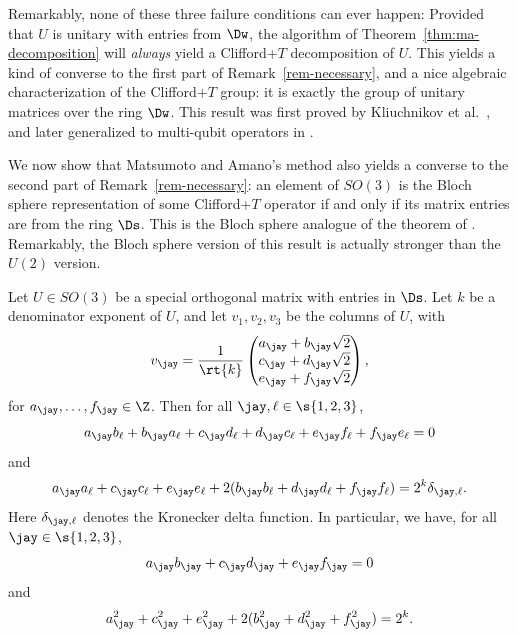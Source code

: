 \documentclass{article}
\begin{document}
Remarkably, none of these three failure conditions can ever happen:
Provided that $U$ is unitary with entries from $\Dw$, the algorithm of
Theorem~\ref{thm:ma-decomposition} will {\em always} yield a
Clifford+$T$ decomposition of $U$. This yields a kind of converse to
the first part of Remark~\ref{rem-necessary}, and a nice algebraic
characterization of the Clifford+$T$ group: it is exactly the group of
unitary matrices over the ring $\Dw$. This result was first proved by
Kliuchnikov et al.~{\cite{Kliuchnikov-etal}}, and later generalized to
multi-qubit operators in {\cite{Giles-Selinger}}.

We now show that Matsumoto and Amano's method also yields a converse
to the second part of Remark~\ref{rem-necessary}: an element of
$SO(3)$ is the Bloch sphere representation of some Clifford+$T$
operator if and only if its matrix entries are from the ring $\Ds$.
This is the Bloch sphere analogue of the theorem of
{\cite{Kliuchnikov-etal}}. Remarkably, the Bloch sphere version of
this result is actually stronger than the $U(2)$ version.

\begin{lemma}\label{lem:dot_product_is_simpler_in_ds}
  Let $U\in SO(3)$ be a special orthogonal matrix with entries in $\Ds$.
  Let $k$ be a denominator exponent of $U$, and let $v_1,v_2,v_3$ be
  the columns of $U$, with
  \[v_{\jay} = \frac{1}{\rt{k}}\left(\begin{matrix}
      a_{\jay}+b_{\jay}\sqrt{2} \\
      c_{\jay}+d_{\jay}\sqrt{2} \\
      e_{\jay}+f_{\jay}\sqrt{2}
    \end{matrix}\right),\]
  for $a_{\jay},\ldots,f_{\jay}\in\Z$.
  Then for all $\jay,\ell\in\s{1,2,3}$,
  \begin{equation}\label{eqn-abba}
    a_{\jay} b_{\ell}+b_{\jay} a_{\ell}+
            c_{\jay} d_{\ell}+d_{\jay} c_{\ell}+e_{\jay} f_{\ell}+f_{\jay} e_{\ell} = 0
  \end{equation}
  and
  \begin{equation}\label{eqn-aacc}
    a_{\jay} a_{\ell}+c_{\jay} c_{\ell}+e_{\jay} e_{\ell}+
    2(b_{\jay} b_{\ell}+d_{\jay} d_{\ell}+f_{\jay} f_{\ell})
    = 2^k\delta_{\jay,\ell}.
  \end{equation}
  Here $\delta_{\jay,\ell}$ denotes the Kronecker delta function. In
  particular, we have, for all $\jay\in\s{1,2,3}$,
  \begin{equation}\label{eqn-abcd}
    a_{\jay} b_{\jay}+
    c_{\jay} d_{\jay}+e_{\jay} f_{\jay} = 0
  \end{equation}
  and
  \begin{equation}\label{eqn-a2c2}
    a_{\jay}^2 + c_{\jay}^2 + e_{\jay}^2 + 2(b_{\jay}^2 + d_{\jay}^2 + f_{\jay}^2) = 2^k.
  \end{equation}
\end{lemma}
\end{document}
